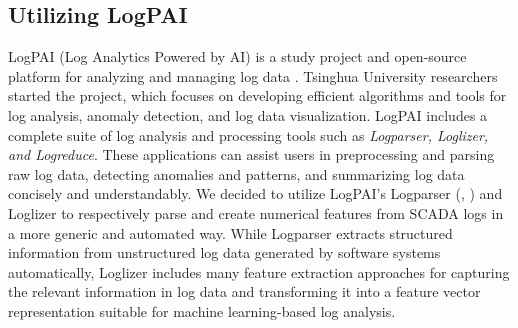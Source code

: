   \subsection{Utilizing LogPAI}
    LogPAI (Log Analytics Powered by AI) is a study project and open-source platform for analyzing and managing log data \cite{LogPAI}. 
    Tsinghua University researchers started the project, which focuses on developing efficient algorithms and tools for log analysis, anomaly detection, and log data visualization.
    LogPAI includes a complete suite of log analysis and processing tools such as \emph{Logparser, Loglizer, and Logreduce}. 
    These applications can assist users in preprocessing and parsing raw log data, detecting anomalies and patterns, and summarizing log data concisely and understandably.
    We decided to utilize LogPAI's Logparser (\cite{Logparser_1}, \cite{Logparser_2}) and Loglizer \cite{Loglizer} to respectively parse and create numerical features from 
    SCADA logs in a more generic and automated way. While Logparser extracts structured information from unstructured log data generated by software systems automatically,
    Loglizer includes many feature extraction approaches for capturing the relevant information in log data and transforming it into a feature vector representation suitable 
    for machine learning-based log analysis. \\

